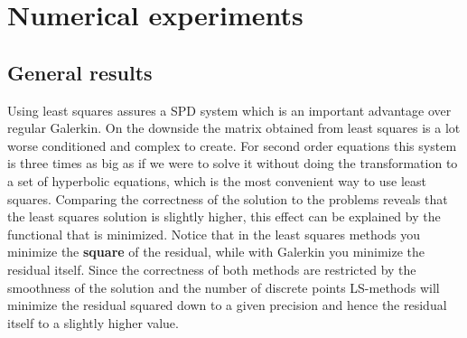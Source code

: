 
\chapter{Numerical experiments} %

\label{chap:results} %


\section{General results}
Using least squares assures a SPD system which is an important advantage over regular Galerkin. On the downside the matrix obtained from least squares is a lot worse conditioned and complex to create. For second order equations this system is three times as big as if we were to solve it without doing the transformation to a set of hyperbolic equations, which is the most convenient way to use least squares. Comparing the correctness of the solution to the problems
reveals that the least squares solution is slightly higher, this effect can be explained by the functional that is minimized. Notice that in the least squares methods you minimize the \textbf{square} of the residual, while with Galerkin you minimize the residual itself. Since the correctness of both methods are restricted by the smoothness of the solution and the number of discrete points LS-methods will minimize the residual squared down to a given precision and hence the residual itself to a slightly higher value. 
%
